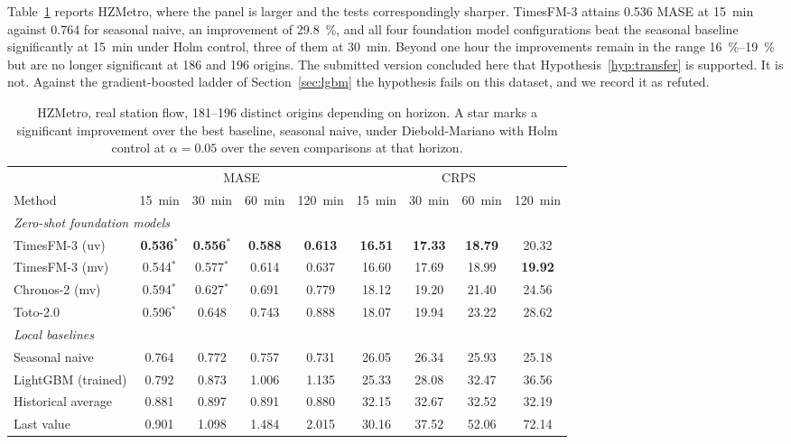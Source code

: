 \documentclass[11pt]{article}
\theoremstyle{plain}
\theoremstyle{definition}
\theoremstyle{remark}
\newcommand{\best}[1]{\textbf{#1}}
\newif\ifrevisionmarkup
\newcommand{\new}[1]{\ifrevisionmarkup\textcolor{revision}{#1}\else#1\fi}
\begin{document}
Table~\ref{tab:hzmetro} reports HZMetro, where the panel is larger and the tests correspondingly sharper. TimesFM-3 attains \num{0.536} MASE at \SI{15}{\minute} against \num{0.764} for seasonal naive, an improvement of \SI{29.8}{\percent}, and all four foundation model configurations beat the seasonal baseline significantly at \SI{15}{\minute} under Holm control, three of them at \SI{30}{\minute}. Beyond one hour the improvements remain in the range \SIrange{16}{19}{\percent} but are no longer significant at \num{186} and \num{196} origins. \new{The submitted version concluded here that Hypothesis~\ref{hyp:transfer} is supported. It is not. Against the gradient-boosted ladder of Section~\ref{sec:lgbm} the hypothesis fails on this dataset, and we record it as refuted.}

\begin{table}[htbp]
\centering
\caption{HZMetro, real station flow, \num{181}--\num{196} distinct origins depending on horizon. A star marks a significant improvement over the best baseline, seasonal naive, under Diebold-Mariano with Holm control at $\alpha=0.05$ over the seven comparisons at that horizon.}
\label{tab:hzmetro}
\small
\begin{tabular}{lcccccccc}
\toprule
& \multicolumn{4}{c}{MASE} & \multicolumn{4}{c}{CRPS} \\
\cmidrule(lr){2-5}\cmidrule(lr){6-9}
Method & \SI{15}{\minute} & \SI{30}{\minute} & \SI{60}{\minute} & \SI{120}{\minute} & \SI{15}{\minute} & \SI{30}{\minute} & \SI{60}{\minute} & \SI{120}{\minute} \\
\midrule
\multicolumn{9}{l}{\emph{Zero-shot foundation models}}\\
TimesFM-3 (uv)          & \best{0.536}$^{*}$ & \best{0.556}$^{*}$ & \best{0.588} & \best{0.613} & \best{16.51} & \best{17.33} & \best{18.79} & 20.32 \\
TimesFM-3 (mv)          & 0.544$^{*}$ & 0.577$^{*}$ & 0.614 & 0.637 & 16.60 & 17.69 & 18.99 & \best{19.92} \\
Chronos-2 (mv)          & 0.594$^{*}$ & 0.627$^{*}$ & 0.691 & 0.779 & 18.12 & 19.20 & 21.40 & 24.56 \\
Toto-2.0                & 0.596$^{*}$ & 0.648 & 0.743 & 0.888 & 18.07 & 19.94 & 23.22 & 28.62 \\
\midrule
\multicolumn{9}{l}{\emph{Local baselines}}\\
Seasonal naive          & 0.764 & 0.772 & 0.757 & 0.731 & 26.05 & 26.34 & 25.93 & 25.18 \\
LightGBM (trained)      & 0.792 & 0.873 & 1.006 & 1.135 & 25.33 & 28.08 & 32.47 & 36.56 \\
Historical average      & 0.881 & 0.897 & 0.891 & 0.880 & 32.15 & 32.67 & 32.52 & 32.19 \\
Last value              & 0.901 & 1.098 & 1.484 & 2.015 & 30.16 & 37.52 & 52.06 & 72.14 \\
\bottomrule
\end{tabular}
\end{table}
\end{document}
